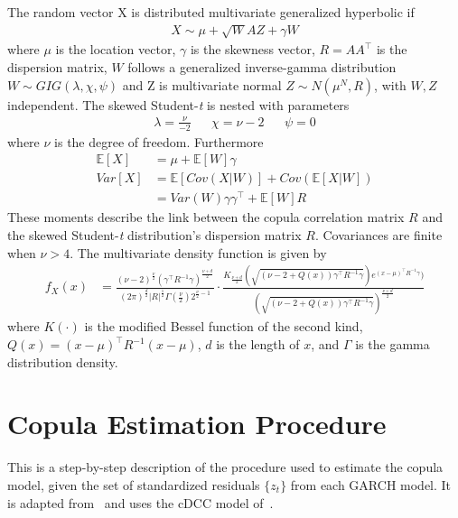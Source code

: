 The random vector X is distributed multivariate generalized hyperbolic if
\begin{align}
    X \sim \mu + \sqrt{W} A Z + \gamma W
\end{align}
where $\mu$ is the location vector, $\gamma$ is the skewness vector, $R = A A^\top$ is the dispersion matrix, $W$ follows a generalized inverse-gamma distribution $W \sim GIG(\lambda, \chi, \psi)$ and Z is multivariate normal $Z \sim N(\mu^N, R)$, with $W, Z$ independent. The skewed Student-\textit{t} is nested with parameters
\begin{align}
    \lambda = \frac{\nu}{-2} && \chi = \nu - 2 && \psi = 0
\end{align}
where $\nu$ is the degree of freedom. Furthermore
\begin{align}
    \mathbb{E}[X] &= \mu + \mathbb{E}[W] \gamma \\
    Var[X] &= \mathbb{E}[Cov(X|W)] + Cov(\mathbb{E}[X|W]) \\
    &= Var(W) \gamma \gamma^\top + \mathbb{E}[W] R \nonumber
\end{align}
These moments describe the link between the copula correlation matrix $R$ and the skewed Student-\textit{t} distribution's dispersion matrix $R$. Covariances are finite when $\nu > 4$. The multivariate density function is given by
\begin{align} \label{eq:dskewt}
    f_X(x) &= \frac{(\nu - 2)^\frac{\nu}{2} (\gamma^\top R^{-1} \gamma)^{\frac{\nu+d}{2}}}{(2 \pi)^{\frac{d}{2}} |R|^\frac{1}{2} \Gamma (\frac{\nu}{2}) 2^{\frac{\nu}{2} - 1}} \cdot \frac{K_{\frac{\nu + d}{2}} ( \sqrt{(\nu - 2 + Q(x)) \gamma^\top R^{-1} \gamma}) e^{(x-\mu)^\top R^{-1} \gamma} )}{( \sqrt{(\nu - 2 + Q(x)) \gamma^\top R^{-1} \gamma})^{\frac{\nu + d}{2}}}
\end{align}
where $K(\cdot)$ is the modified Bessel function of the second kind, $Q(x) = (x-\mu)^\top R^{-1} (x-\mu)$, $d$ is the length of $x$, and $\Gamma$ is the gamma distribution density.

\newpage

\section{Copula Estimation Procedure} 
\label{app:copula_cdcc}

This is a step-by-step description of the procedure used to estimate the copula model, given the set of standardized residuals $\{z_{t}\}$ from each GARCH model. It is adapted from~\textcite{ChristoffersenErrunzaJacobLanglois2012} and uses the cDCC model of~\textcite{Aielli2013}.

